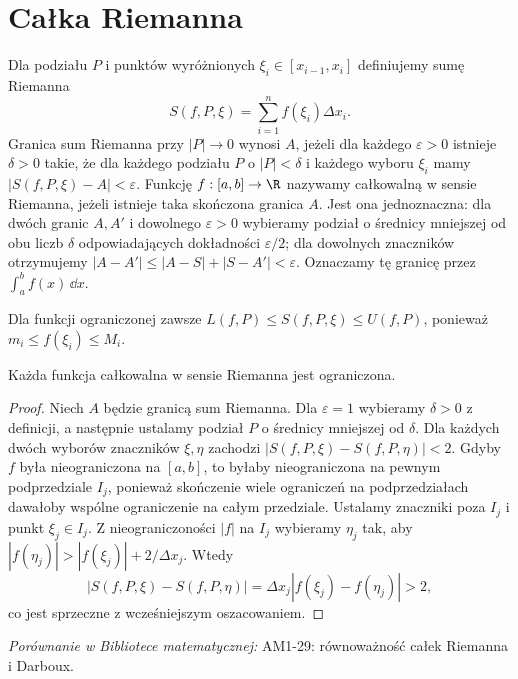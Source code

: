 \section{Całka Riemanna}
\providecommand{\atlasref}[2]{#2}
\label{ma1:ch:riemann-integral}
\begin{definicja}
\label{ma1:def:riemann-sum}
Dla podziału $P$ i punktów wyróżnionych $\xi_i\in[x_{i-1},x_i]$ definiujemy sumę Riemanna
\[
 S(f,P,\xi)=\sum_{i=1}^n f(\xi_i)\Delta x_i.
\]
Granica sum Riemanna przy $|P|\to0$ wynosi $A$, jeżeli dla każdego $\varepsilon>0$ istnieje $\delta>0$ takie, że dla każdego podziału $P$ o $|P|<\delta$ i każdego wyboru $\xi_i$ mamy $|S(f,P,\xi)-A|<\varepsilon$. Funkcję $f:[a,b]\to\R$ nazywamy całkowalną w sensie Riemanna, jeżeli istnieje taka skończona granica $A$. Jest ona jednoznaczna: dla dwóch granic $A,A'$ i dowolnego $\varepsilon>0$ wybieramy podział o średnicy mniejszej od obu liczb $\delta$ odpowiadających dokładności $\varepsilon/2$; dla dowolnych znaczników otrzymujemy $|A-A'|\le |A-S|+|S-A'|<\varepsilon$. Oznaczamy tę granicę przez $\int_a^b f(x)\,\dd x$.
\end{definicja}
Dla funkcji ograniczonej zawsze $L(f,P)\le S(f,P,\xi)\le U(f,P)$, ponieważ $m_i\le f(\xi_i)\le M_i$.

\begin{stwierdzenie}
Każda funkcja całkowalna w sensie Riemanna jest ograniczona.
\end{stwierdzenie}
\begin{proof}
Niech $A$ będzie granicą sum Riemanna. Dla $\varepsilon=1$ wybieramy $\delta>0$ z definicji, a następnie ustalamy podział $P$ o średnicy mniejszej od $\delta$. Dla każdych dwóch wyborów znaczników $\xi,\eta$ zachodzi $|S(f,P,\xi)-S(f,P,\eta)|<2$. Gdyby $f$ była nieograniczona na $[a,b]$, to byłaby nieograniczona na pewnym podprzedziale $I_j$, ponieważ skończenie wiele ograniczeń na podprzedziałach dawałoby wspólne ograniczenie na całym przedziale. Ustalamy znaczniki poza $I_j$ i punkt $\xi_j\in I_j$. Z nieograniczoności $|f|$ na $I_j$ wybieramy $\eta_j$ tak, aby $|f(\eta_j)|>|f(\xi_j)|+2/\Delta x_j$. Wtedy
\[
 |S(f,P,\xi)-S(f,P,\eta)|=\Delta x_j|f(\xi_j)-f(\eta_j)|>2,
\]
co jest sprzeczne z wcześniejszym oszacowaniem.
\end{proof}

\noindent\emph{Porównanie w Bibliotece matematycznej:} \atlasref{AM1-29::ma1:thm:riemann-darboux-equivalence}{AM1-29: równoważność całek Riemanna i Darboux}.

